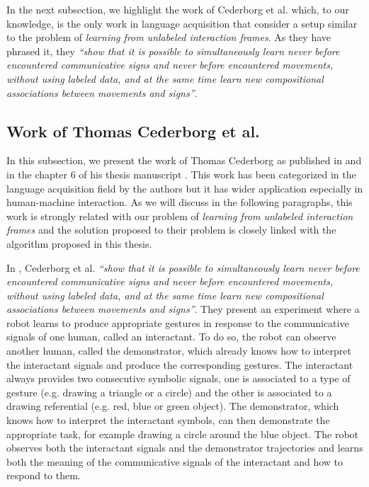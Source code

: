 In the next subsection, we highlight the work of Cederborg et al. \cite{cederborg2011imitating} which, to our knowledge, is the only work in language acquisition that consider a setup similar to the problem of \emph{learning from unlabeled interaction frames}. As they have phrased it, they \textit{``show that it is possible to simultaneously learn never before encountered communicative signs and never before encountered movements, without using labeled data, and at the same time learn new compositional associations between movements and signs''}.

\subsection{Work of Thomas Cederborg et al.}
\label{chapter:related:language:thomas}

In this subsection, we present the work of Thomas Cederborg as published in \cite{cederborg2011imitating} and in the chapter 6 of his thesis manuscript \cite{cederborg2014thesis}. This work has been categorized in the language acquisition field by the authors but it has wider application especially in human-machine interaction. As we will discuss in the following paragraphs, this work is strongly related with our problem of \emph{learning from unlabeled interaction frames} and the solution proposed to their problem is closely linked with the algorithm proposed in this thesis.

In \cite{cederborg2011imitating}, Cederborg et al. \textit{``show that it is possible to simultaneously learn never before encountered communicative signs and never before encountered movements, without using labeled data, and at the same time learn new compositional associations between movements and signs''}. They present an experiment where a robot learns to produce appropriate gestures in response to the communicative signals of one human, called an interactant. To do so, the robot can observe another human, called the demonstrator, which already knows how to interpret the interactant signals and produce the corresponding gestures. The interactant always provides two consecutive symbolic signals, one is associated to a type of gesture (e.g. drawing a triangle or a circle) and the other is associated to a drawing referential (e.g. red, blue or green object). The demonstrator, which knows how to interpret the interactant symbols, can then demonstrate the appropriate task, for example drawing a circle around the blue object. The robot observes both the interactant signals and the demonstrator trajectories and learns both the meaning of the communicative signals of the interactant and how to respond to them.

